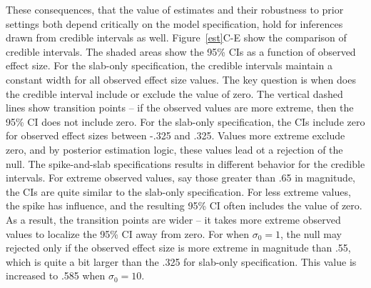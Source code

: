 These consequences, that the value of estimates and their robustness to prior settings both depend critically on the model specification, hold for inferences drawn from credible intervals as well.  Figure~\ref{est}{C-E} show the comparison of credible intervals.  The shaded areas show the 95\% CIs as a function of observed effect size.  For the slab-only specification, the credible intervals maintain a constant width for all observed effect size values.  The key question is when does the credible interval include or exclude the value of zero.   The vertical dashed lines show transition points -- if the observed values are more extreme, then the 95\% CI does not include zero.  For the slab-only specification, the CIs include zero for observed effect sizes between -.325 and .325.  Values more extreme exclude zero, and by posterior estimation logic, these values lead ot a rejection of the null.   The spike-and-slab specifications results in different behavior for the credible intervals.  For extreme observed values, say those greater than .65 in magnitude, the CIs are quite similar to the slab-only specification.  For  less extreme values, the spike has influence, and the resulting 95\% CI often includes the value of zero.  As a result, the transition points are wider -- it takes more extreme observed values to localize the 95\% CI away from zero.  For when $\sigma_0=1$, the null may rejected only if the observed effect size is more extreme in magnitude than .55, which is quite a bit larger than the .325 for slab-only specification.  This value is increased to .585 when $\sigma_0=10$.  

